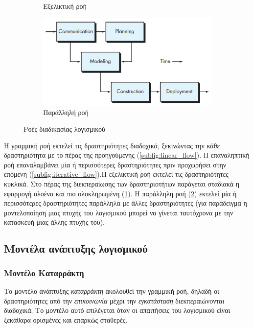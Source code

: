 \begin{figure}[h!]
\begin{subfigure}{\linewidth}
        \caption{Εξελικτική ροή}
        \label{subfig:evolutionery_flow}
    \end{subfigure}
    \begin{subfigure}{\linewidth}
        \centering
        \includegraphics[width=0.7\linewidth]{images/chapter2/software_engineering/parallel_process_flow.png}
        \caption{Παράλληλή ροή}
        \label{subfig:parallel_flow}
    \end{subfigure}
    \caption{Ροές διαδικασίας λογισμικού}
    \label{fig:software_process_flow}
\end{figure}

H γραμμική ροή εκτελεί τις δραστηριότητες διαδοχικά, ξεκινώντας την κάθε δραστηριότητα με το πέρας της προηγούμενης (\ref{subfig:linear_flow}). Η επαναληπτική ροή επαναλαμβάνει μία ή περισσότερες δραστηριότητες πριν προχωρήσει στην επόμενη (\ref{subfig:iterative_flow}).H εξελικτική ροή εκτελεί τις δραστηριότητες κυκλικά. Στο πέρας της διεκπεραίωσης των δραστηριοτήτων παράγεται σταδιακά η εφαρμογή ολοένα και πιο ολοκληρωμένη (\ref{subfig:evolutionery_flow}). Η παράλληλη ροή (\ref{subfig:parallel_flow}) εκτελεί μία ή περισσότερες δραστηριότητες παράλληλα με άλλες δραστηριότητες (για παράδειγμα η μοντελοποίηση μιας πτυχής του λογισμικού μπορεί να γίνεται ταυτόχρονα με την κατασκευή μιας άλλης πτυχής του).

\subsection{Μοντέλα ανάπτυξης λογισμικού}

\subsubsection{Μοντέλο Καταρράκτη}

Το μοντέλο ανάπτυξης \textsl{καταρράκτη} ακολουθεί την γραμμική ροή, δηλαδή οι δραστηριότητες από την \textsl{επικοινωνία} μέχρι την \textsl{εγκατάσταση} διεκπεραιώνονται διαδοχικά. Το μοντέλο αυτό επιλέγεται όταν οι απαιτήσεις του λογισμικού είναι ξεκάθαρα ορισμένες και επαρκώς σταθερές.

